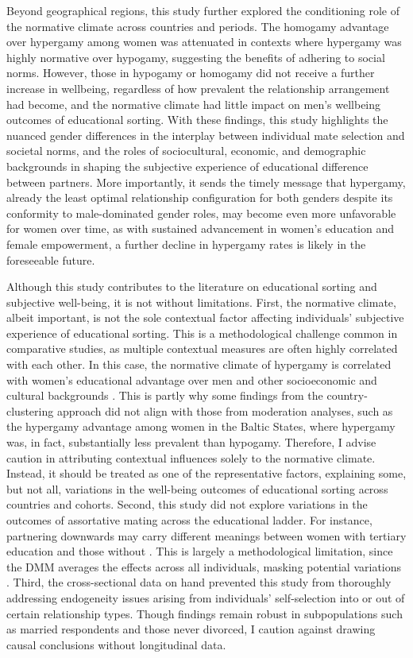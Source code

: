 Beyond geographical regions, this study further explored the conditioning role of the normative climate across countries and periods. The homogamy advantage over hypergamy among women was attenuated in contexts where hypergamy was highly normative over hypogamy, suggesting the benefits of adhering to social norms. However, those in hypogamy or homogamy did not receive a further increase in wellbeing, regardless of how prevalent the relationship arrangement had become, and the normative climate had little impact on men's wellbeing outcomes of educational sorting. With these findings, this study highlights the nuanced gender differences in the interplay between individual mate selection and societal norms, and the roles of sociocultural, economic, and demographic backgrounds in shaping the subjective experience of educational difference between partners. More importantly, it sends the timely message that hypergamy, already the least optimal relationship configuration for both genders despite its conformity to male-dominated gender roles, may become even more unfavorable for women over time, as with sustained advancement in women's education and female empowerment, a further decline in hypergamy rates is likely in the foreseeable future.

Although this study contributes to the literature on educational sorting and subjective well-being, it is not without limitations. First, the normative climate, albeit important, is not the sole contextual factor affecting individuals' subjective experience of educational sorting. This is a methodological challenge common in comparative studies, as multiple contextual measures are often highly correlated with each other. In this case, the normative climate of hypergamy is correlated with women's educational advantage over men and other socioeconomic and cultural backgrounds \parencite{dehauwReversedGenderGap2017,esteveEndHypergamyGlobal2016}. This is partly why some findings from the country-clustering approach did not align with those from moderation analyses, such as the hypergamy advantage among women in the Baltic States, where hypergamy was, in fact, substantially less prevalent than hypogamy. Therefore, I advise caution in attributing contextual influences solely to the normative climate. Instead, it should be treated as one of the representative factors, explaining some, but not all, variations in the well-being outcomes of educational sorting across countries and cohorts. Second, this study did not explore variations in the outcomes of assortative mating across the educational ladder. For instance, partnering downwards may carry different meanings between women with tertiary education and those without \parencite{potarcaAreWomenHypogamous2022}. This is largely a methodological limitation, since the DMM averages the effects across all individuals, masking potential variations \parencite{sobelDiagonalMobilityModels1981,sobelSocialMobilityFertility1985}. Third, the cross-sectional data on hand prevented this study from thoroughly addressing endogeneity issues arising from individuals' self-selection into or out of certain relationship types. Though findings remain robust in subpopulations such as married respondents and those never divorced, I caution against drawing causal conclusions without longitudinal data.

